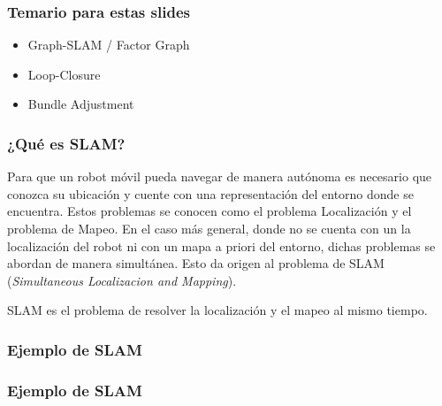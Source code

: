 \begin{frame}
	\frametitle{Temario para estas slides}
	
	\begin{itemize}
		\item Graph-SLAM / Factor Graph
		\item Loop-Closure
		\item Bundle Adjustment
	\end{itemize}
	
\end{frame}

\begin{frame}
	\frametitle{¿Qué es SLAM?}
	
	Para que un robot móvil pueda navegar de manera autónoma es necesario que conozca su ubicación y cuente con una representación del entorno donde se encuentra. Estos problemas se conocen como el problema Localización y el problema de Mapeo. En el caso más general, donde no se cuenta con un la localización del robot ni con un mapa a priori del entorno, dichas problemas se abordan de manera simultánea. Esto da origen al problema de SLAM (\emph{Simultaneous Localizacion and Mapping}).
	\begin{block}{}
		SLAM es el problema de resolver la localización y el mapeo al mismo tiempo.
	\end{block}
	
\end{frame}


\begin{frame}
    \frametitle{Ejemplo de SLAM}
    
    \begin{figure}
        \hfill{}
    \end{figure}
    
\end{frame}

\begin{frame}
    \frametitle{Ejemplo de SLAM}
    
    \begin{figure}
        \hfill{}
    \end{figure}
    
\end{frame}

